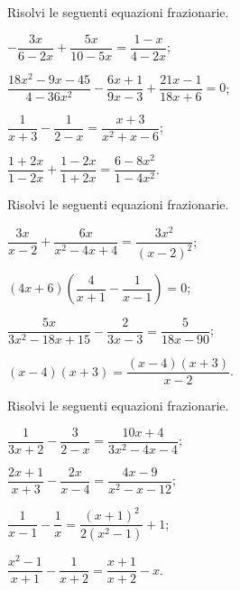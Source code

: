 \begin{esercizio}[\Ast]
\label{ese:17.22}
Risolvi le seguenti equazioni frazionarie.
\begin{multicols}{2}
\begin{enumeratea}
\spazielenx
 \item $-{\dfrac{3x}{6-2x}}+\dfrac{5x}{10-5x}=\dfrac{1-x}{4-2x}$;
 \item $\dfrac{18x^{2}-9x-45}{4-36x^{2}}-\dfrac{6x+1}{9x-3}+\dfrac{21x-1}{18x+6}=0$;
 \item $\dfrac{1}{x+3}-\dfrac{1}{2-x}=\dfrac{x+3}{x^{2}+x-6}$;
 \item $\dfrac{1+2x}{1-2x}+\dfrac{1-2x}{1+2x}=\dfrac{6-8x^{2}}{1-4x^{2}}$.
\end{enumeratea}
\end{multicols}
\end{esercizio}

\begin{esercizio}[\Ast]
\label{ese:17.23}
Risolvi le seguenti equazioni frazionarie.
\begin{multicols}{2}
\begin{enumeratea}
\spazielenx
 \item $\dfrac{3x}{x-2}+\dfrac{6x}{x^{2}-4x+4}=\dfrac{3x^{2}}{(x-2)^{2}}$;
 \item $(4x+6)\left(\dfrac{4}{x+1}-\dfrac{1}{x-1}\right)=0$;
 \item $\dfrac{5x}{3x^{2}-18x+15}-\dfrac{2}{3x-3}=\dfrac{5}{18x-90}$;
 \item $(x-4)(x+3)=\dfrac{(x-4)(x+3)}{x-2}$.
\end{enumeratea}
\end{multicols}
\end{esercizio}

\begin{esercizio}[\Ast]
\label{ese:17.24}
Risolvi le seguenti equazioni frazionarie.
\begin{multicols}{2}
\begin{enumeratea}
 \item $\dfrac{1}{3x+2}-\dfrac{3}{2-x}=\dfrac{10x+4}{3x^{2}-4x-4}$;
 \item $\dfrac{2x+1}{x+3}-\dfrac{2x}{x-4}=\dfrac{4x-9}{x^{2}-x-12}$;
 \item $\dfrac{1}{x-1}-\dfrac{1}{x}=\dfrac{(x+1)^{2}}{2(x^{2}-1)}+1$;
 \item $\dfrac{x^{2}-1}{x+1}-\dfrac{1}{x+2}=\dfrac{x+1}{x+2}-x$.
\end{enumeratea}
\end{multicols}
\end{esercizio}

